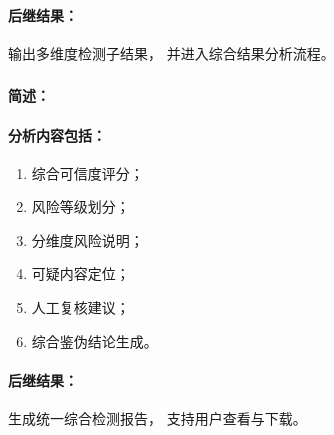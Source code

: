 \paragraph*{后继结果：}

输出多维度检测子结果，
并进入综合结果分析流程。

\subsubsection{}

\paragraph*{简述：}


\paragraph*{分析内容包括：}

\begin{enumerate}
    \item 综合可信度评分；
    \item 风险等级划分；
    \item 分维度风险说明；
    \item 可疑内容定位；
    \item 人工复核建议；
    \item 综合鉴伪结论生成。
\end{enumerate}

\paragraph*{后继结果：}

生成统一综合检测报告，
支持用户查看与下载。
